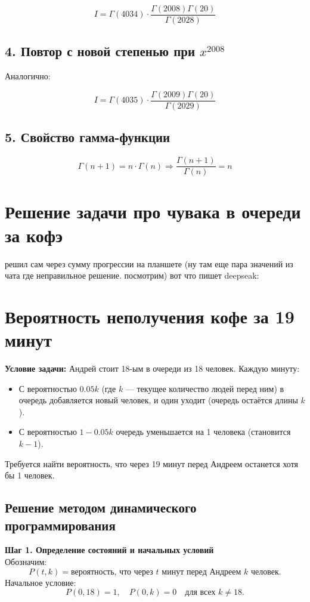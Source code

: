 \documentclass{article}
\begin{document}
\[
\boxed{I = \Gamma(4034) \cdot \frac{\Gamma(2008)\Gamma(20)}{\Gamma(2028)}}
\]

\subsection*{4. Повтор с новой степенью при \texorpdfstring{$x^{2008}$}{x\^{}2008}}

Аналогично:

\[
\boxed{I = \Gamma(4035) \cdot \frac{\Gamma(2009)\Gamma(20)}{\Gamma(2029)}}
\]

\subsection*{5. Свойство гамма-функции}

\[
\Gamma(n + 1) = n \cdot \Gamma(n) \Rightarrow \frac{\Gamma(n + 1)}{\Gamma(n)} = \boxed{n}
\]

\section*{Решение задачи про чувака в очереди за кофэ}
решил сам через сумму прогрессии на планшете (ну там еще пара значений из чата где неправильное решение. посмотрим)
вот что пишет deepseak:

\section*{Вероятность неполучения кофе за 19 минут}

\textbf{Условие задачи:} Андрей стоит 18-ым в очереди из 18 человек. Каждую минуту:
\begin{itemize}
    \item С вероятностью \(0.05k\) (где \(k\) — текущее количество людей перед ним) в очередь добавляется новый человек, и один уходит (очередь остаётся длины \(k\)).
    \item С вероятностью \(1 - 0.05k\) очередь уменьшается на 1 человека (становится \(k-1\)).
\end{itemize}
Требуется найти вероятность, что через 19 минут перед Андреем останется хотя бы 1 человек.

\subsection*{Решение методом динамического программирования}

\textbf{Шаг 1. Определение состояний и начальных условий} \\
Обозначим:
\[
P(t, k) = \text{вероятность, что через \(t\) минут перед Андреем \(k\) человек}.
\]
Начальное условие:
\[
P(0, 18) = 1, \quad P(0, k) = 0 \quad \text{для всех } k \neq 18.
\]
\end{document}
